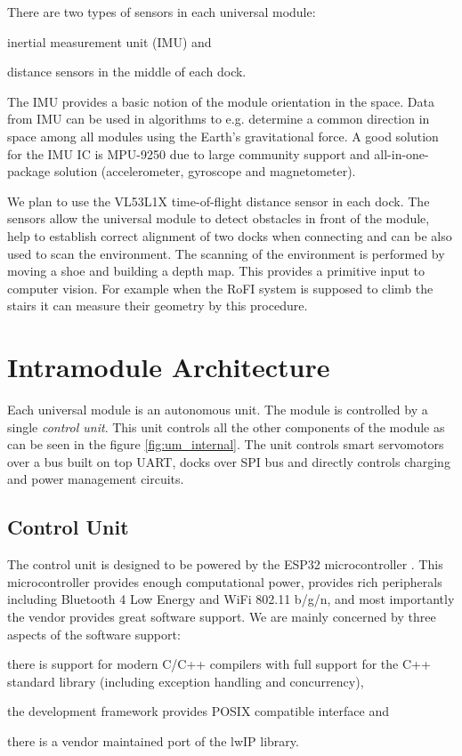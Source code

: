 There are two types of sensors in each universal module:
\begin{enumerate*}
    \item inertial measurement unit (IMU) and
    \item distance sensors in the middle of each dock.
\end{enumerate*}
The IMU provides a basic notion of the module orientation in the space. Data
from IMU can be used in algorithms to e.g. determine a common direction in space
among all modules using the Earth's gravitational force. A good solution for the
IMU IC is MPU-9250 due to large community support and
all-in-one-package solution (accelerometer, gyroscope and magnetometer).

We plan to use the VL53L1X time-of-flight distance sensor in each
dock. The sensors allow the universal module to detect obstacles in front of the
module, help to establish correct alignment of two docks when connecting and can
be also used to scan the environment. The scanning of the environment is
performed by moving a shoe and building a depth map. This provides a primitive
input to computer vision. For example when the RoFI system is supposed to climb
the stairs it can measure their geometry by this procedure.

\section{Intramodule Architecture}

Each universal module is an autonomous unit. The module is controlled by a
single \emph{control unit}. This unit controls all the other components of the
module as can be seen in the figure \ref{fig:um_internal}. The unit controls
smart servomotors over a bus built on top UART, docks over SPI bus and directly
controls charging and power management circuits.

\subsection{Control Unit}

The control unit is designed to be powered by the ESP32 microcontroller
. This microcontroller provides enough computational power, provides
rich peripherals including Bluetooth 4 Low Energy and WiFi 802.11 b/g/n, and
most importantly the vendor provides great software support. We are mainly
concerned by three aspects of the software support:
\begin{enumerate*}
    \item there is support for modern C/C++ compilers with full support for the
    C++ standard library (including exception handling and concurrency),
    \item the development framework provides POSIX compatible interface and
    \item there is a vendor maintained port of the lwIP library.
\end{enumerate*}

